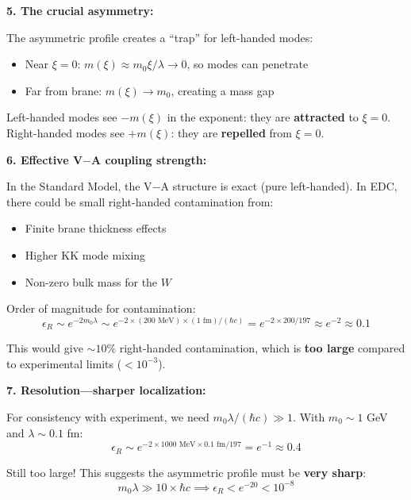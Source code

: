 \begin{tcolorbox}[colback=green!5, colframe=green!50!black,
  title={Quantitative V$-$A: How Strong Is the Chiral Selection?}, breakable]
\textbf{5. The crucial asymmetry:}

The asymmetric profile creates a ``trap'' for left-handed modes:
\begin{itemize}
  \item Near $\xi = 0$: $m(\xi) \approx m_0 \xi/\lambda \to 0$, so modes can penetrate
  \item Far from brane: $m(\xi) \to m_0$, creating a mass gap
\end{itemize}

Left-handed modes see $-m(\xi)$ in the exponent: they are \textbf{attracted} to $\xi = 0$.
Right-handed modes see $+m(\xi)$: they are \textbf{repelled} from $\xi = 0$.

\textbf{6. Effective V$-$A coupling strength:}

In the Standard Model, the V$-$A structure is exact (pure left-handed).
In EDC, there could be small right-handed contamination from:
\begin{itemize}
  \item Finite brane thickness effects
  \item Higher KK mode mixing
  \item Non-zero bulk mass for the $W$
\end{itemize}

Order of magnitude for contamination:
\begin{equation}
\epsilon_{R} \sim e^{-2m_0\lambda} \sim e^{-2 \times (200 \text{ MeV}) \times (1 \text{ fm})/(\hbar c)}
= e^{-2 \times 200/197} \approx e^{-2} \approx 0.1
\end{equation}

This would give $\sim 10\%$ right-handed contamination, which is \textbf{too large}
compared to experimental limits ($< 10^{-3}$).

\textbf{7. Resolution---sharper localization:}

For consistency with experiment, we need $m_0 \lambda / (\hbar c) \gg 1$. With
$m_0 \sim 1$ GeV and $\lambda \sim 0.1$ fm:
\begin{equation}
\epsilon_R \sim e^{-2 \times 1000 \text{ MeV} \times 0.1 \text{ fm} / 197} = e^{-1} \approx 0.4
\end{equation}

Still too large! This suggests the asymmetric profile must be \textbf{very sharp}:
\begin{equation}
m_0 \lambda \gg 10 \times \hbar c \implies \epsilon_R < e^{-20} < 10^{-8}
\end{equation}


\end{tcolorbox}
